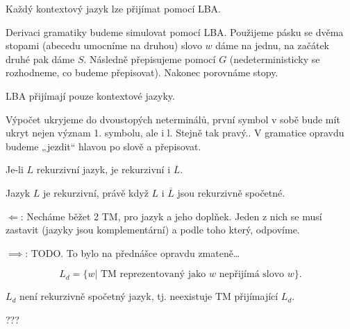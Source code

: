 \documentclass[12pt]{article}                   %
\begin{document}
        \begin{veta}
            Každý kontextový jazyk lze přijímat pomocí LBA.

            \begin{dukazin}
                Derivaci gramatiky budeme simulovat pomocí LBA. Použijeme pásku se dvěma stopami (abecedu umocníme na druhou) slovo $w$ dáme na jednu, na začátek druhé pak dáme $S$. Následně přepisujeme pomocí $G$ (nedeterministicky se rozhodneme, co budeme přepisovat). Nakonec porovnáme stopy.
            \end{dukazin}
        \end{veta}

        \begin{veta}
            LBA přijímají pouze kontextové jazyky.

            \begin{dukazin}
                Výpočet ukryjeme do dvoustopých neterminálů, první symbol v sobě bude mít ukryt nejen význam 1. symbolu, ale i l. Stejně tak pravý.. V gramatice opravdu budeme „jezdit“ hlavou po slově a přepisovat.
            \end{dukazin}
        \end{veta}

        \begin{lemma}
            Je-li $L$ rekurzivní jazyk, je rekurzivní i $\overline{L}$.
        \end{lemma}

        \begin{veta}
            Jazyk $L$ je rekurzivní, právě když $L$ i $\overline{L}$ jsou rekurzivně spočetné.

            \begin{dukazin}
                $\Leftarrow$: Necháme běžet 2 TM, pro jazyk a jeho doplňek. Jeden z nich se musí zastavit (jazyky jsou komplementární) a podle toho který, odpovíme.

                $\implies$: TODO. To bylo na přednášce opravdu zmateně…
            \end{dukazin}
        \end{veta}

        \begin{definice}
            $$ L_d = \{w | \text{ TM reprezentovaný jako $w$ nepřijímá slovo $w$}\}. $$
        \end{definice}

        \begin{veta}
            $L_d$ není rekurzivně spočetný jazyk, tj. neexistuje TM přijímající $L_d$.

            \begin{dukazin}
                ???
            \end{dukazin}
        \end{veta}
\end{document}
